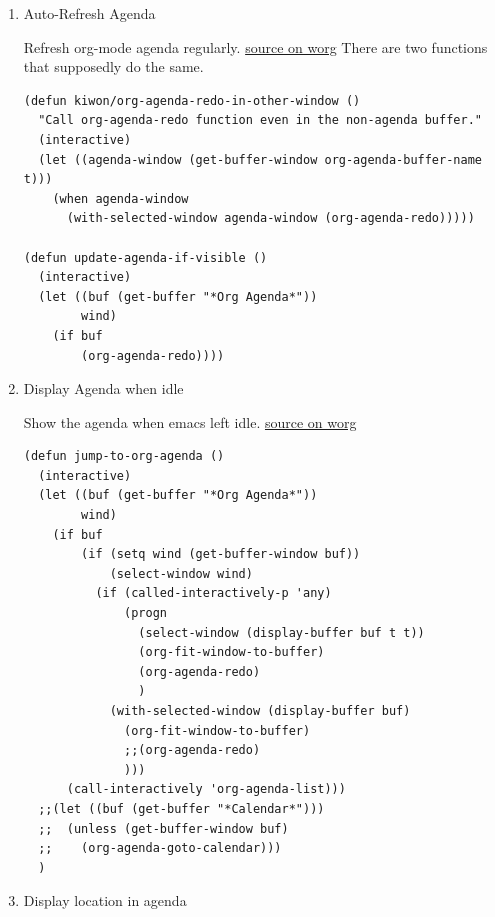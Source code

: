\documentclass[11pt]{article}
\begin{document}
\begin{enumerate}
That's the export function to update the agenda view.

\begin{verbatim}
(setq org-agenda-exporter-settings
      '((ps-number-of-columns 2)
        (ps-portrait-mode t)
        (org-agenda-add-entry-text-maxlines 5)
        (htmlize-output-type 'font)))

(defun dmg-org-update-agenda-file (&optional force)
  (interactive)
  (save-excursion
    (save-window-excursion
      (let ((file "~/www/agenda/agenda.html"))
        (org-agenda-list)
        (org-agenda-write file)))))
\end{verbatim}
\item Auto-Refresh Agenda
\label{sec:orgc950ff3}

Refresh org-mode agenda regularly.  \href{https://orgmode.org/worg/org-hacks.html\#orgab827a7}{source on worg} There are two
functions that supposedly do the same.

\begin{verbatim}
(defun kiwon/org-agenda-redo-in-other-window ()
  "Call org-agenda-redo function even in the non-agenda buffer."
  (interactive)
  (let ((agenda-window (get-buffer-window org-agenda-buffer-name t)))
    (when agenda-window
      (with-selected-window agenda-window (org-agenda-redo)))))

(defun update-agenda-if-visible ()
  (interactive)
  (let ((buf (get-buffer "*Org Agenda*"))
        wind)
    (if buf
        (org-agenda-redo))))
\end{verbatim}
\item Display Agenda when idle
\label{sec:org2c53479}

Show the agenda when emacs left idle.  \href{https://orgmode.org/worg/org-hacks.html\#orgaea636d}{source on worg}

\begin{verbatim}
(defun jump-to-org-agenda ()
  (interactive)
  (let ((buf (get-buffer "*Org Agenda*"))
        wind)
    (if buf
        (if (setq wind (get-buffer-window buf))
            (select-window wind)
          (if (called-interactively-p 'any)
              (progn
                (select-window (display-buffer buf t t))
                (org-fit-window-to-buffer)
                (org-agenda-redo)
                )
            (with-selected-window (display-buffer buf)
              (org-fit-window-to-buffer)
              ;;(org-agenda-redo)
              )))
      (call-interactively 'org-agenda-list)))
  ;;(let ((buf (get-buffer "*Calendar*")))
  ;;  (unless (get-buffer-window buf)
  ;;    (org-agenda-goto-calendar)))
  )
\end{verbatim}
\item Display location in agenda
\label{sec:org08a2277}


\end{enumerate}
\end{document}
